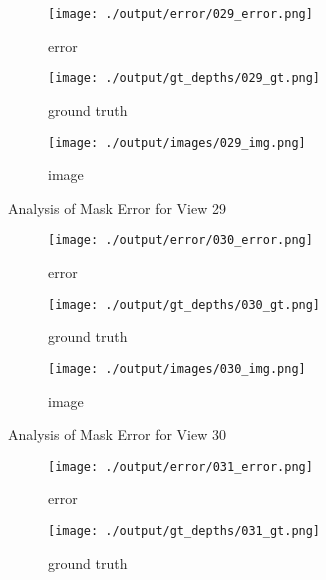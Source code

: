 \documentclass{article}
\begin{document}
\begin{figure}
	\centering
	\begin{subfigure}{0.3\textwidth}
		\centering
		\texttt{[image: ./output/error/029\_error.png]}
		\caption{error}
		\label{fig:error29}
	\end{subfigure}
	\hfill
	\centering
	\begin{subfigure}{0.3\textwidth}
		\centering
		\texttt{[image: ./output/gt\_depths/029\_gt.png]}
		\caption{ground truth}
		\label{fig:gt29}
	\end{subfigure}
	\hfill
	\centering
	\begin{subfigure}{0.3\textwidth}
		\centering
		\texttt{[image: ./output/images/029\_img.png]}
		\caption{image}
		\label{fig:img29}
	\end{subfigure}
	\hfill
	\caption{Analysis of Mask Error for View 29}
	\label{fig:error_analys29}
\end{figure}\begin{figure}
	\centering
	\begin{subfigure}{0.3\textwidth}
		\centering
		\texttt{[image: ./output/error/030\_error.png]}
		\caption{error}
		\label{fig:error30}
	\end{subfigure}
	\hfill
	\centering
	\begin{subfigure}{0.3\textwidth}
		\centering
		\texttt{[image: ./output/gt\_depths/030\_gt.png]}
		\caption{ground truth}
		\label{fig:gt30}
	\end{subfigure}
	\hfill
	\centering
	\begin{subfigure}{0.3\textwidth}
		\centering
		\texttt{[image: ./output/images/030\_img.png]}
		\caption{image}
		\label{fig:img30}
	\end{subfigure}
	\hfill
	\caption{Analysis of Mask Error for View 30}
	\label{fig:error_analys30}
\end{figure}\begin{figure}
	\centering
	\begin{subfigure}{0.3\textwidth}
		\centering
		\texttt{[image: ./output/error/031\_error.png]}
		\caption{error}
		\label{fig:error31}
	\end{subfigure}
	\hfill
	\centering
	\begin{subfigure}{0.3\textwidth}
		\centering
		\texttt{[image: ./output/gt\_depths/031\_gt.png]}
		\caption{ground truth}
		\label{fig:gt31}
	\end{subfigure}
	\hfill
	\centering
	\begin{subfigure}{0.3\textwidth}

\end{subfigure}
\end{figure}
\end{document}
